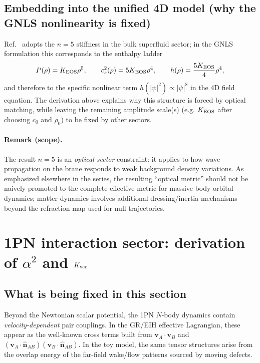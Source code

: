 \documentclass[11pt]{article}
\begin{document}
\subsection{Embedding into the unified 4D model (why the GNLS nonlinearity is fixed)}

Ref.~\cite{norris2026_4d_model} adopts the $n=5$ stiffness in the bulk superfluid sector; in the GNLS formulation this corresponds to the enthalpy ladder
\begin{equation}
P(\rho)=K_{\rm EOS}\rho^5,\qquad
c_s^2(\rho)=5K_{\rm EOS}\rho^4,\qquad
h(\rho)=\frac{5K_{\rm EOS}}{4}\rho^4,
\label{eq:n5_ladder}
\end{equation}
and therefore to the specific nonlinear term $h(|\psi|^2)\propto |\psi|^8$ in the 4D field equation. The derivation above explains why this structure is forced by optical matching, while leaving the remaining amplitude scale(s) (e.g. $K_{\rm EOS}$ after choosing $c_0$ and $\rho_0$) to be fixed by other sectors. 

\paragraph{Remark (scope).}
The result $n=5$ is an \emph{optical-sector} constraint: it applies to how wave propagation on the brane responds to weak background density variations. As emphasized elsewhere in the series, the resulting ``optical metric'' should not be naively promoted to the complete effective metric for massive-body orbital dynamics; matter dynamics involves additional dressing/inertia mechanisms beyond the refraction map used for null trajectories. 

\section{1PN interaction sector: derivation of \texorpdfstring{$\alpha^2$}{alpha^2} and \texorpdfstring{$K_{\rm vec}$}{K_vec}}
\label{sec:1pn-interaction-alpha-K}

\subsection{What is being fixed in this section}
\label{sec:1pn-interaction-goal}

Beyond the Newtonian scalar potential, the 1PN $N$-body dynamics contain
\emph{velocity-dependent} pair couplings.  In the GR/EIH effective Lagrangian,
these appear as the well-known cross terms built from
$\mathbf v_A\cdot \mathbf v_B$ and $(\mathbf v_A\cdot \hat{\mathbf n}_{AB})(\mathbf v_B\cdot \hat{\mathbf n}_{AB})$.
In the toy model, the same tensor structures arise from the overlap energy of
the far-field wake/flow patterns sourced by moving defects.
\end{document}

